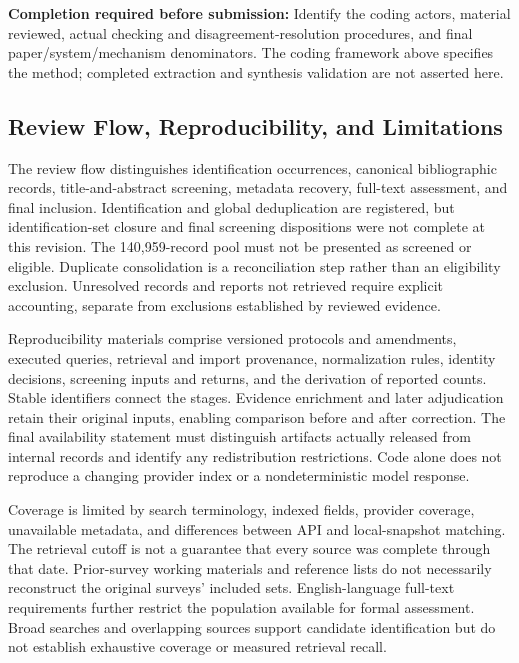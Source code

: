 \noindent\textbf{Completion required before submission:} Identify the coding actors, material reviewed, actual checking and disagreement-resolution procedures, and final paper/system/mechanism denominators. The coding framework above specifies the method; completed extraction and synthesis validation are not asserted here.

\subsection{Review Flow, Reproducibility, and Limitations}
\label{sec:methodology-limitations}

The review flow distinguishes identification occurrences, canonical bibliographic records, title-and-abstract screening, metadata recovery, full-text assessment, and final inclusion. Identification and global deduplication are registered, but identification-set closure and final screening dispositions were not complete at this revision. The 140,959-record pool must not be presented as screened or eligible. Duplicate consolidation is a reconciliation step rather than an eligibility exclusion. Unresolved records and reports not retrieved require explicit accounting, separate from exclusions established by reviewed evidence.

Reproducibility materials comprise versioned protocols and amendments, executed queries, retrieval and import provenance, normalization rules, identity decisions, screening inputs and returns, and the derivation of reported counts. Stable identifiers connect the stages. Evidence enrichment and later adjudication retain their original inputs, enabling comparison before and after correction. The final availability statement must distinguish artifacts actually released from internal records and identify any redistribution restrictions. Code alone does not reproduce a changing provider index or a nondeterministic model response.

Coverage is limited by search terminology, indexed fields, provider coverage, unavailable metadata, and differences between API and local-snapshot matching. The retrieval cutoff is not a guarantee that every source was complete through that date. Prior-survey working materials and reference lists do not necessarily reconstruct the original surveys' included sets. English-language full-text requirements further restrict the population available for formal assessment. Broad searches and overlapping sources support candidate identification but do not establish exhaustive coverage or measured retrieval recall.

